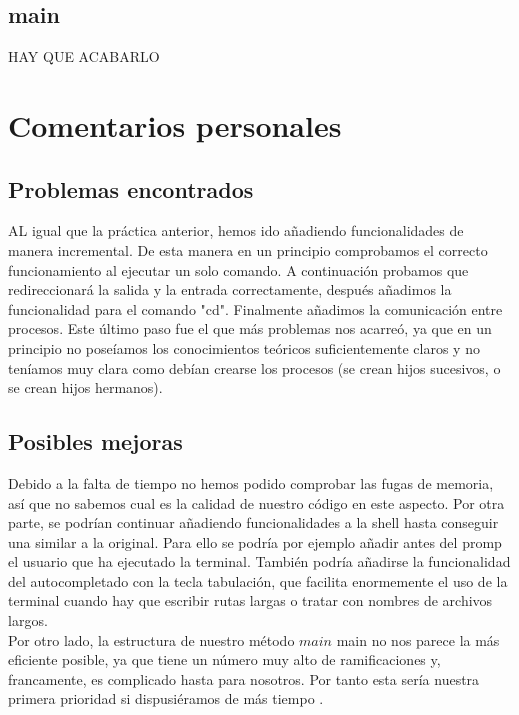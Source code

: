 \section{main}
HAY QUE ACABARLO

\chapter{Comentarios personales}
\section{Problemas encontrados}
AL igual que la práctica anterior, hemos ido añadiendo funcionalidades de manera incremental. De esta manera en un principio comprobamos el correcto funcionamiento al ejecutar un solo comando. A continuación probamos que redireccionará la salida y la entrada correctamente, después añadimos la funcionalidad para el comando "cd". Finalmente añadimos la comunicación entre procesos. Este último paso fue el que más problemas nos acarreó, ya que en un principio no poseíamos los conocimientos teóricos suficientemente claros y no teníamos muy clara como debían crearse los procesos (se crean hijos sucesivos, o se crean hijos hermanos).
\section{Posibles mejoras}
Debido a la falta de tiempo no hemos podido comprobar las fugas de memoria, así que no sabemos cual es la calidad de nuestro código en este aspecto. Por otra parte, se podrían continuar añadiendo funcionalidades a la shell hasta conseguir una similar a la original. Para ello se podría por ejemplo añadir antes del promp el usuario que ha ejecutado la terminal. También podría añadirse la funcionalidad del autocompletado con la tecla tabulación, que facilita enormemente el uso de la terminal cuando hay que escribir rutas largas o tratar con nombres de archivos largos.\\
Por otro lado, la estructura de nuestro método $main$ main no nos parece la más eficiente posible, ya que tiene un número muy alto de ramificaciones y, francamente, es complicado hasta para nosotros. Por tanto esta sería nuestra primera prioridad si dispusiéramos de más tiempo . 